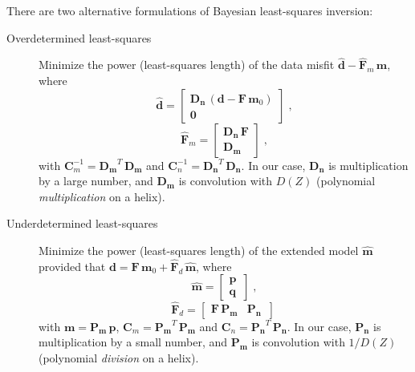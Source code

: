 There are two alternative formulations of Bayesian least-squares inversion:
\begin{description}
\item[Overdetermined least-squares] Minimize the power (least-squares length) of the data misfit $\widehat{\mathbf{d}} - \widehat{\mathbf{F}}_m\,\mathbf{m}$, where
\begin{equation}
\label{eq:dhat}
\widehat{\mathbf{d}} = \left[\begin{array}{l} \mathbf{D_n}\,\left(\mathbf{d} - \mathbf{F}\,\mathbf{m}_0\right) \\
\mathbf{0}\,\end{array}\right]\;,
\end{equation} 
\begin{equation}
\label{eq:fmhat}
\widehat{\mathbf{F}}_m = \left[\begin{array}{l} \mathbf{D_n}\,\mathbf{F} \\
\mathbf{D_m}\,\end{array}\right]\;,
\end{equation} 
with $\mathbf{C}_m^{-1} = \mathbf{D_m}^T\,\mathbf{D_m}$ and $\mathbf{C}_n^{-1} =
\mathbf{D_n}^T\,\mathbf{D_n}$. In our case, $\mathbf{D_n}$ is multiplication
by a large number, and $\mathbf{D_m}$ is convolution with $D(Z)$ (polynomial \emph{multiplication} on a helix).
\item[Underdetermined least-squares] Minimize the power (least-squares length) of the extended model $\widehat{\mathbf{m}}$ provided 
that $\mathbf{d} = \mathbf{F}\,\mathbf{m}_0 + \widehat{\mathbf{F}}_d\,\widehat{\mathbf{m}}$, where
\begin{equation}
\label{eq:mhat}
\widehat{\mathbf{m}} = \left[\begin{array}{l} \mathbf{p} \\
\mathbf{q}\,\end{array}\right]\;,
\end{equation} 
\begin{equation}
\label{eq:fdhat}
\widehat{\mathbf{F}}_d = \left[\begin{array}{cc} \mathbf{F}\,\mathbf{P_m} &
\mathbf{P_n}\,\end{array}\right]\;
\end{equation}
with $\mathbf{m} = \mathbf{P_m}\,\mathbf{p}$, $\mathbf{C}_m = \mathbf{P_m}^T\,\mathbf{P_m}$ and $\mathbf{C}_n =
\mathbf{P_n}^T\,\mathbf{P_n}$. In our case, $\mathbf{P_n}$ is multiplication
by a small number, and $\mathbf{P_m}$ is convolution with $1/D(Z)$ (polynomial \emph{division} on a helix).
\end{description}

